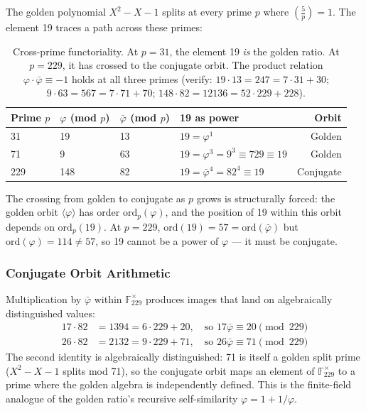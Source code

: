 \documentclass[12pt,oneside]{article}
\theoremstyle{principia}
\theoremstyle{definition}
\theoremstyle{remark}
\providecommand{\FF}{\mathbb{F}}
\providecommand{\vp}{\varphi}
\providecommand{\vpbar}{\bar{\varphi}}
\begin{document}
The golden polynomial $X^2 - X - 1$ splits at every prime $p$ where $\left(\frac{5}{p}\right) = 1$. The element 19 traces a path across these primes:

\begin{table}[!ht]
\centering\small
\begin{tabular}{@{}llllr@{}}
\toprule
\textbf{Prime $p$} & \textbf{$\vp$ (mod $p$)} & \textbf{$\vpbar$ (mod $p$)} & \textbf{19 as power} & \textbf{Orbit} \\
\midrule
31  & 19 & 13 & $19 = \vp^1$ & Golden \\
71  & 9  & 63 & $19 = \vp^3 = 9^3 \equiv 729 \equiv 19$ & Golden \\
229 & 148 & 82 & $19 = \vpbar^4 = 82^4 \equiv 19$ & Conjugate \\
\bottomrule
\end{tabular}
\caption{Cross-prime functoriality. At $p = 31$, the element 19 \emph{is} the golden ratio. At $p = 229$, it has crossed to the conjugate orbit. The product relation $\vp \cdot \vpbar \equiv -1$ holds at all three primes (verify: $19 \cdot 13 = 247 = 7 \cdot 31 + 30$; $9 \cdot 63 = 567 = 7 \cdot 71 + 70$; $148 \cdot 82 = 12136 = 52 \cdot 229 + 228$).}
\end{table}

The crossing from golden to conjugate as $p$ grows is structurally forced: the golden orbit $\langle\vp\rangle$ has order $\mathrm{ord}_p(\vp)$, and the position of 19 within this orbit depends on $\mathrm{ord}_p(19)$. At $p = 229$, $\mathrm{ord}(19) = 57 = \mathrm{ord}(\vpbar)$ but $\mathrm{ord}(\vp) = 114 \neq 57$, so 19 cannot be a power of $\vp$ --- it must be conjugate.

\subsubsection*{Conjugate Orbit Arithmetic}

Multiplication by $\vpbar$ within $\FF_{229}^\times$ produces images that land on algebraically distinguished values:
\begin{align}
17 \cdot 82 &= 1394 = 6 \cdot 229 + 20, \quad\text{so } 17\vpbar \equiv 20 \pmod{229} \\
26 \cdot 82 &= 2132 = 9 \cdot 229 + 71, \quad\text{so } 26\vpbar \equiv 71 \pmod{229}
\end{align}
The second identity is algebraically distinguished: 71 is itself a golden split prime ($X^2 - X - 1$ splits mod 71), so the conjugate orbit maps an element of $\FF_{229}^\times$ to a prime where the golden algebra is independently defined. This is the finite-field analogue of the golden ratio's recursive self-similarity $\vp = 1 + 1/\vp$.
\end{document}
